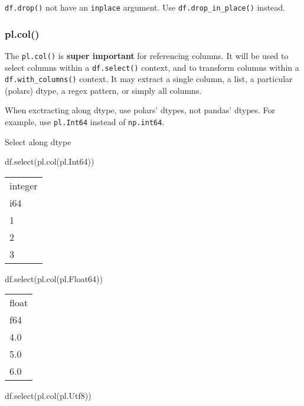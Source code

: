 \documentclass[
  letterpaper,
  DIV=11,
  numbers=noendperiod]{scrartcl}
\newenvironment{Shaded}{\begin{snugshade}}{\end{snugshade}}
\newcommand{\NormalTok}[1]{\textcolor[rgb]{0.00,0.23,0.31}{#1}}
\begin{document}
\texttt{df.drop()} not have an \texttt{inplace} argument. Use
\texttt{df.drop\_in\_place()} instead.

\hypertarget{pl.col}{%
\subsubsection{pl.col()}\label{pl.col}}

The \texttt{pl.col()} is \textbf{super important} for referencing
columns. It will be used to select columns within a \texttt{df.select()}
context, and to transform columns within a \texttt{df.with\_columns()}
context. It may extract a single column, a list, a particular (polars)
dtype, a regex pattern, or simply all columns.

When exctracting along dtype, use polars' dtypes, not pandas' dtypes.
For example, use \texttt{pl.Int64} instead of \texttt{np.int64}.

Select along dtype

\begin{Shaded}
\begin{Highlighting}[]
\NormalTok{df.select(pl.col(pl.Int64))}
\end{Highlighting}
\end{Shaded}

\begin{longtable}[]{@{}l@{}}
\toprule()
integer \\
i64 \\
\midrule()
\endhead
1 \\
2 \\
3 \\
\bottomrule()
\end{longtable}

\begin{Shaded}
\begin{Highlighting}[]
\NormalTok{df.select(pl.col(pl.Float64))}
\end{Highlighting}
\end{Shaded}

\begin{longtable}[]{@{}l@{}}
\toprule()
float \\
f64 \\
\midrule()
\endhead
4.0 \\
5.0 \\
6.0 \\
\bottomrule()
\end{longtable}

\begin{Shaded}
\begin{Highlighting}[]
\NormalTok{df.select(pl.col(pl.Utf8))}
\end{Highlighting}
\end{Shaded}
\end{document}
